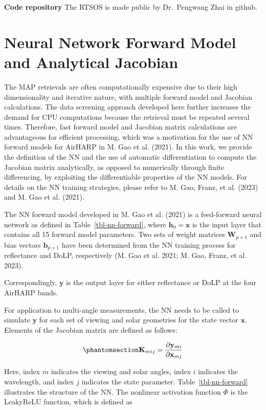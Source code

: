 \documentclass[
  letterpaper,
  open=any]{scrbook}
\begin{document}
\textbf{Code repository} The RTSOS is made public by Dr.~Pengwang Zhai
in github.

\chapter{Neural Network Forward Model and Analytical
Jacobian}\label{neural-network-forward-model-and-analytical-jacobian}

The MAP retrievals are often computationally expensive due to their high
dimensionality and iterative nature, with multiple forward model and
Jacobian calculations. The data screening approach developed here
further increases the demand for CPU computations because the retrieval
must be repeated several times. Therefore, fast forward model and
Jacobian matrix calculations are advantageous for efficient processing,
which was a motivation for the use of NN forward models for AirHARP in
M. Gao et al. (2021). In this work, we provide the definition of the NN
and the use of automatic differentiation to compute the Jacobian matrix
analytically, as opposed to numerically through finite differencing, by
exploiting the differentiable properties of the NN models. For details
on the NN training strategies, please refer to M. Gao, Franz, et al.
(2023) and M. Gao et al. (2021).

The NN forward model developed in M. Gao et al. (2021) is a feed-forward
neural network as defined in Table~\ref{tbl-nn-forward}, where
\(\mathbf{h}_0=\mathbf{x}\) is the input layer that contains all 15
forward model parameters. Two sets of weight matrices
\(\mathbf{W}_{p+1}\) and bias vectors \(\mathbf{b}_{p+1}\) have been
determined from the NN training process for reflectance and DoLP,
respectively (M. Gao et al. 2021; M. Gao, Franz, et al. 2023).

Correspondingly, \(\mathbf{y}\) is the output layer for either
reflectance or DoLP at the four AirHARP bands.

For application to multi-angle measurements, the NN needs to be called
to simulate \(\mathbf{y}\) for each set of viewing and solar geometries
for the state vector \(\mathbf{x}\). Elements of the Jacobian matrix are
defined as follows:

\begin{equation}\phantomsection\label{eq-jacobian}{
\mathbf{K}_{mij}
=
\frac{\partial \mathbf{y}_{mi}}
{\partial \mathbf{x}_{mj}}
}\end{equation}

Here, index \(m\) indicates the viewing and solar angles, index \(i\)
indicates the wavelength, and index \(j\) indicates the state parameter.
Table~\ref{tbl-nn-forward} illustrates the structure of the NN. The
nonlinear activation function \(\Phi\) is the LeakyReLU function, which
is defined as
\end{document}
